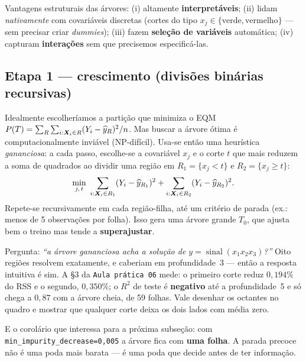 \documentclass[11pt,a4paper]{article}
\begin{document}
\begin{ideia}
Vantagens estruturais das árvores: (i) altamente \textbf{interpretáveis};
(ii) lidam \emph{nativamente} com covariáveis discretas (cortes do tipo
$x_j\in\{\text{verde},\text{vermelho}\}$ --- sem precisar criar \emph{dummies});
(iii) fazem \textbf{seleção de variáveis} automática; (iv) capturam
\textbf{interações} sem que precisemos especificá-las.
\end{ideia}

\subsection{Etapa 1 --- crescimento (divisões binárias recursivas)}
Idealmente escolheríamos a partição que minimiza o EQM
$P(T)=\sum_R\sum_{i:\bm{X}_i\in R}(Y_i-\widehat y_R)^2/n$. Mas buscar a árvore ótima é
computacionalmente inviável (NP-difícil). Usa-se então uma heurística
\emph{gananciosa}: a cada passo, escolhe-se a covariável $x_j$ e o corte $t$ que
mais reduzem a soma de quadrados ao dividir uma região em
$R_1=\{x_j<t\}$ e $R_2=\{x_j\ge t\}$:
\begin{equation}\label{eq:split}
  \min_{j,\,t}\ \sum_{i:\bm{X}_i\in R_1}(Y_i-\widehat y_{R_1})^2
            + \sum_{i:\bm{X}_i\in R_2}(Y_i-\widehat y_{R_2})^2 .
\end{equation}
Repete-se recursivamente em cada região-filha, até um critério de parada (ex.: menos
de 5 observações por folha). Isso gera uma árvore grande $T_0$, que ajusta bem o
treino mas tende a \textbf{superajustar}.

\begin{emsala}
Pergunta: \emph{``a árvore gananciosa acha a solução de
$y=\operatorname{sinal}(x_1x_2x_3)$?''} Oito regiões resolvem exatamente, e caberiam
em profundidade~3 --- então a resposta intuitiva é sim. A §3 da \texttt{Aula prática
06} mede: o primeiro corte reduz $0{,}194\%$ do RSS e o segundo, $0{,}350\%$; o $R^2$
de teste é \textbf{negativo} até a profundidade~5 e só chega a $0{,}87$ com a árvore
cheia, de 59 folhas. Vale desenhar os octantes no quadro e mostrar que qualquer corte
deixa os dois lados com média zero.

E o corolário que interessa para a próxima subseção: com
\texttt{min\_impurity\_decrease=0,005} a árvore fica com \textbf{uma folha}. A parada
precoce não é uma poda mais barata --- é uma poda que decide antes de ter informação.
\end{emsala}
\end{document}
